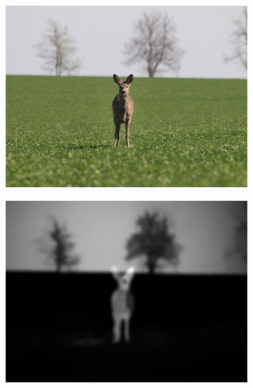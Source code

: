 \begin{figure}[H]
\begin{subfigure}{0.32\textwidth}
      \caption{}
    \end{subfigure}
    \vspace{1pt}
    
    \begin{subfigure}{0.32\textwidth}
      \centering
      \includegraphics[scale=0.933]{obrazky/ORIG23.jpg}
      \caption{}
    \end{subfigure}
    \begin{subfigure}{0.32\textwidth}
      \centering
      \includegraphics[scale=1.0]{obrazky/badMargolinSM.jpg}
      \caption{}
      \label{obr:autocropFailsE}
    \end{subfigure}
    \begin{subfigure}{0.32\textwidth}

\end{subfigure}
\end{figure}
